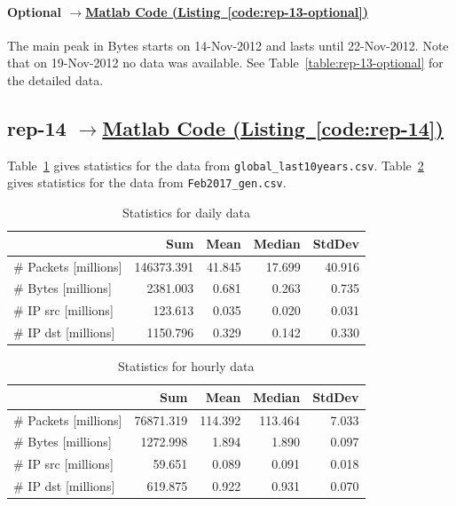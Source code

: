 \documentclass{article}
\newcommand{\codelink}[1]{%
    \hyperref[#1]{\quad$\rightarrow$\enskip Matlab Code (Listing~\ref{#1})}%
}
\begin{document}
\paragraph{Optional \codelink{code:rep-13-optional}}

The main peak in Bytes starts on 14-Nov-2012 and lasts until 22-Nov-2012. Note that
on 19-Nov-2012 no data was available. See Table~\ref{table:rep-13-optional}
for the detailed data.

\subsection{rep-14 \codelink{code:rep-14}}

Table~\ref{table:rep-14-daily} gives statistics for the data from
\texttt{global\_last10years.csv}. Table~\ref{table:rep-14-hourly} gives
statistics for the data from \texttt{Feb2017\_gen.csv}.

\begin{table}[H]
    \centering
    \begin{tabular}{l|rrrr}
                & Sum & Mean & Median & StdDev \\
                \hline
        \# Packets [millions] &   146373.391 & 41.845 & 17.699 & 40.916 \\
        \# Bytes [millions]   &    2381.003 & 0.681 & 0.263 & 0.735 \\
        \# IP src [millions]     & 123.613 & 0.035 & 0.020 & 0.031 \\
        \# IP dst  [millions]    & 1150.796 & 0.329 & 0.142 & 0.330 \\
    \end{tabular}
    \caption{\label{table:rep-14-daily} Statistics for daily data}
\end{table}

\begin{table}[H]
    \centering
    \begin{tabular}{l|rrrr}
                & Sum & Mean & Median & StdDev \\
                \hline
        \# Packets [millions] &    76871.319 & 114.392 & 113.464 & 7.033 \\
        \# Bytes  [millions]  &    1272.998  &1.894 & 1.890 & 0.097      \\
        \# IP src  [millions]    & 59.651 & 0.089 & 0.091 & 0.018        \\
        \# IP dst   [millions]   & 619.875 & 0.922 & 0.931 & 0.070       \\
    \end{tabular}
    \caption{\label{table:rep-14-hourly} Statistics for hourly data}
\end{table}
\end{document}
